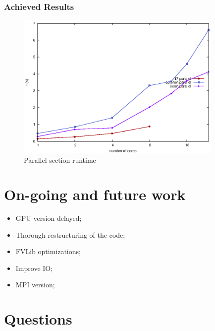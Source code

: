 \documentclass{beamer}
\begin{document}
\begin{frame}
	\frametitle{Achieved Results}
	\begin{center}

	\begin{figure}[!htp]
		\includegraphics[width=10cm]{images/parallel.eps}
		\caption{Parallel section runtime}
		\label{fig:roofline}
	\end{figure}
	\end{center}
\end{frame}


\section{On-going and future work}
\begin{frame}
	\begin{center}
	\begin{itemize}
		\item GPU version delayed;
		\item Thorough restructuring of the code;
		\item FVLib optimizations;
		\item Improve IO;
		\item MPI version;
	\end{itemize}
	\end{center}
\end{frame}

\section{Questions}
\begin{frame}
	\titlepage
	
	
\end{frame}
\end{document}
